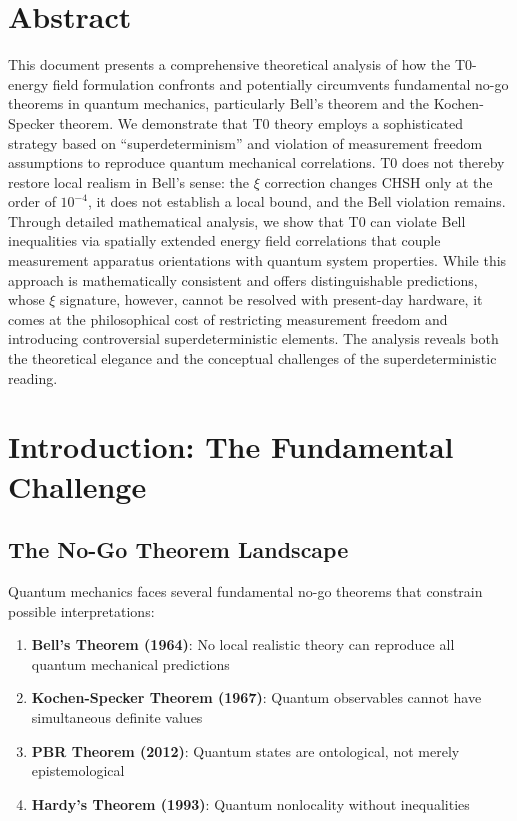 \section*{Abstract}
		This document presents a comprehensive theoretical analysis of how the T0-energy field formulation confronts and potentially circumvents fundamental no-go theorems in quantum mechanics, particularly Bell's theorem and the Kochen-Specker theorem. We demonstrate that T0 theory employs a sophisticated strategy based on ``superdeterminism'' and violation of measurement freedom assumptions to reproduce quantum mechanical correlations. T0 does not thereby restore local realism in Bell's sense: the $\xi$ correction changes CHSH only at the order of $10^{-4}$, it does not establish a local bound, and the Bell violation remains. Through detailed mathematical analysis, we show that T0 can violate Bell inequalities via spatially extended energy field correlations that couple measurement apparatus orientations with quantum system properties. While this approach is mathematically consistent and offers distinguishable predictions, whose $\xi$ signature, however, cannot be resolved with present-day hardware, it comes at the philosophical cost of restricting measurement freedom and introducing controversial superdeterministic elements. The analysis reveals both the theoretical elegance and the conceptual challenges of the superdeterministic reading.

	
	
	\section{Introduction: The Fundamental Challenge}
	
	\subsection{The No-Go Theorem Landscape}
	
	Quantum mechanics faces several fundamental no-go theorems that constrain possible interpretations:
	
	\begin{enumerate}
		\item \textbf{Bell's Theorem (1964)}: No local realistic theory can reproduce all quantum mechanical predictions
		\item \textbf{Kochen-Specker Theorem (1967)}: Quantum observables cannot have simultaneous definite values
		\item \textbf{PBR Theorem (2012)}: Quantum states are ontological, not merely epistemological
		\item \textbf{Hardy's Theorem (1993)}: Quantum nonlocality without inequalities
	\end{enumerate}
	
